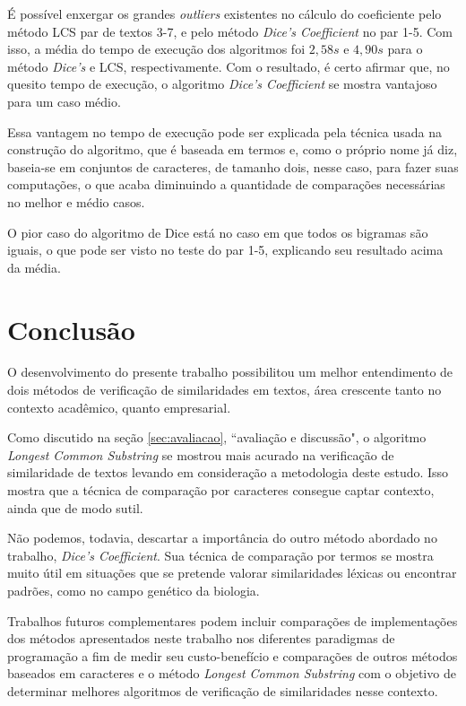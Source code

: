 \documentclass[12pt]{article}
\begin{document}
É possível enxergar os grandes \textit{outliers} existentes no cálculo do coeficiente pelo método LCS par de textos 3-7, e pelo método \textit{Dice's Coefficient} no par 1-5. Com isso, a média do tempo de execução dos algoritmos foi $2,58 s$ e $4,90 s$ para o método \textit{Dice's} e LCS, respectivamente. Com o resultado, é certo afirmar que, no quesito tempo de execução, o algoritmo \textit{Dice's Coefficient} se mostra vantajoso para um caso médio. 

Essa vantagem no tempo de execução pode ser explicada pela técnica usada na construção do algoritmo, que é baseada em termos e, como o próprio nome já diz, baseia-se em conjuntos de caracteres, de tamanho dois, nesse caso, para fazer suas computações, o que acaba diminuindo a quantidade de comparações necessárias no melhor e médio casos. 

O pior caso do algoritmo de Dice está no caso em que todos os bigramas são iguais, o que pode ser visto no teste do par 1-5, explicando seu resultado acima da média.

\section{Conclusão}

O desenvolvimento do presente trabalho possibilitou um melhor entendimento de dois métodos de verificação de similaridades em textos, área crescente tanto no contexto acadêmico, quanto empresarial.

Como discutido na seção \ref{sec:avaliacao}, ``avaliação e discussão", o algoritmo \textit{Longest Common Substring} se mostrou mais acurado na verificação de similaridade de textos levando em consideração a metodologia deste estudo. Isso mostra que a técnica de comparação por caracteres consegue captar contexto, ainda que de modo sutil.

Não podemos, todavia, descartar a importância do outro método abordado no trabalho, \textit{Dice's Coefficient}. Sua técnica de comparação por termos se mostra muito útil em situações que se pretende valorar similaridades léxicas ou encontrar padrões, como no campo genético da biologia.

Trabalhos futuros complementares podem incluir comparações de implementações dos métodos apresentados neste trabalho nos diferentes paradigmas de programação a fim de medir seu custo-benefício e comparações de outros métodos baseados em caracteres e o método \textit{Longest Common Substring} com o objetivo de determinar melhores algoritmos de verificação de similaridades nesse contexto.



\end{document}

